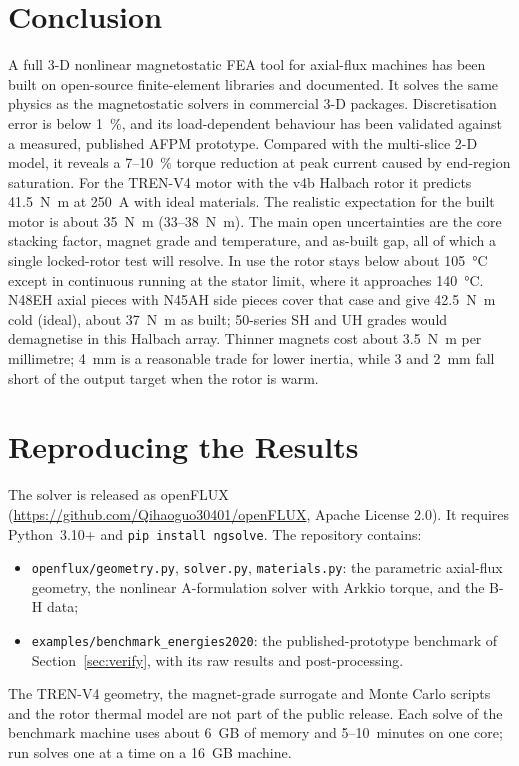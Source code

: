 \documentclass[journal]{IEEEtran}
\newcommand{\Nm}{\si{\newton\metre}}
\begin{document}
\section{Conclusion}
A full 3-D nonlinear magnetostatic FEA tool for axial-flux machines has been built on open-source finite-element libraries and documented. It solves the same physics as the magnetostatic solvers in commercial 3-D packages. Discretisation error is below \SI{1}{\percent}, and its load-dependent behaviour has been validated against a measured, published AFPM prototype. Compared with the multi-slice 2-D model, it reveals a 7--\SI{10}{\percent} torque reduction at peak current caused by end-region saturation. For the TREN-V4 motor with the v4b Halbach rotor it predicts \SI{41.5}{\Nm} at \SI{250}{A} with ideal materials. The realistic expectation for the built motor is about \SI{35}{\Nm} (33--\SI{38}{\Nm}). The main open uncertainties are the core stacking factor, magnet grade and temperature, and as-built gap, all of which a single locked-rotor test will resolve. In use the rotor stays below about \SI{105}{\celsius} except in continuous running at the stator limit, where it approaches \SI{140}{\celsius}. N48EH axial pieces with N45AH side pieces cover that case and give \SI{42.5}{\Nm} cold (ideal), about \SI{37}{\Nm} as built; 50-series SH and UH grades would demagnetise in this Halbach array. Thinner magnets cost about \SI{3.5}{\Nm} per millimetre; \SI{4}{mm} is a reasonable trade for lower inertia, while 3 and \SI{2}{mm} fall short of the output target when the rotor is warm.

\appendices
\section{Reproducing the Results}
The solver is released as openFLUX (\url{https://github.com/Qihaoguo30401/openFLUX}, Apache License 2.0). It requires Python~3.10+ and \texttt{pip install ngsolve}. The repository contains:
\begin{itemize}
\item \texttt{openflux/geometry.py}, \texttt{solver.py}, \texttt{materials.py}: the parametric axial-flux geometry, the nonlinear A-formulation solver with Arkkio torque, and the B-H data;
\item \texttt{examples/benchmark\_energies2020}: the published-prototype benchmark of Section~\ref{sec:verify}, with its raw results and post-processing.
\end{itemize}
The TREN-V4 geometry, the magnet-grade surrogate and Monte Carlo scripts and the rotor thermal model are not part of the public release. Each solve of the benchmark machine uses about \SI{6}{GB} of memory and 5--10~minutes on one core; run solves one at a time on a \SI{16}{GB} machine.

\FloatBarrier


\end{document}
